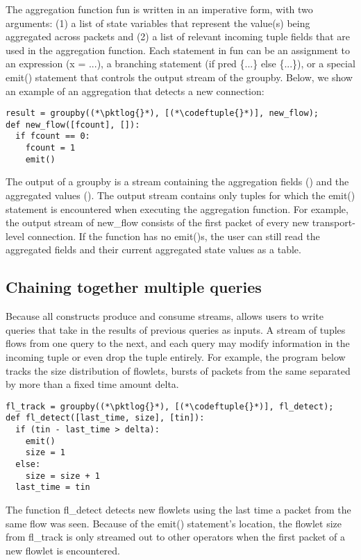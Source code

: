 The aggregation function {\ct fun} is written in an imperative form, with two
arguments: (1) a list of state variables that represent the value(s) being
aggregated across packets and (2) a list of relevant incoming tuple fields that
are used in the aggregation function. Each statement in {\ct fun} can be an
assignment to an expression ({\ct x = ...}), a branching statement ({\ct if
pred \{...\} else \{...\}}), or a special {\ct emit()} statement that controls
the output stream of the {\ct groupby}. Below, we show an example of an
aggregation that detects a new connection:

\begin{lstlisting}
result = groupby((*\pktlog{}*), [(*\codeftuple{}*)], new_flow);
def new_flow([fcount], []):
  if fcount == 0:
    fcount = 1
    emit()
\end{lstlisting}

The output of a {\ct groupby} is a stream containing the aggregation fields
(\eg \txtftuple) and the aggregated values (). The output
stream contains only tuples for which the {\ct emit()} statement is encountered
when executing the aggregation function. For example, the output stream of {\ct
new\_flow} consists of the first packet of every new transport-level
connection. If the function has no {\ct emit()}s, the user can still read the
aggregated fields and their current aggregated state values as a table.

\subsection{Chaining together multiple queries}
Because all \TheSystem constructs produce and consume streams, \TheSystem
allows users to write queries that take in the results of previous queries as
inputs. A stream of tuples flows from one query to the next, and each query may
modify information in the incoming tuple or even drop the tuple entirely. For
example, the program below tracks the size distribution of flowlets, \ie bursts
of packets from the same \txtftuple separated by more than a fixed time amount
{\ct delta}.

\begin{lstlisting}
fl_track = groupby((*\pktlog{}*), [(*\codeftuple{}*)], fl_detect);
def fl_detect([last_time, size], [tin]):
  if (tin - last_time > delta):
    emit()
    size = 1
  else:
    size = size + 1
  last_time = tin
\end{lstlisting}

The function {\ct fl\_detect} detects new flowlets using the last time a packet
from the same flow was seen. Because of the {\ct emit()} statement's location,
the flowlet size from {\ct fl\_track} is only streamed out to other operators
when the first packet of a new flowlet is encountered.

